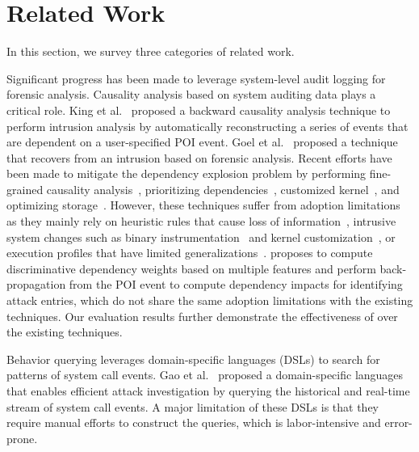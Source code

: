 
\section{Related Work}
\label{sec:literature}

In this section, we survey three categories of related work.


Significant progress has been made to leverage system-level audit logging for forensic analysis.
%
Causality analysis based on system auditing data plays a critical role.
King et al.~\cite{backtracking,backtracking2} proposed a backward causality analysis technique to perform intrusion analysis by automatically reconstructing a series of events that are dependent on a user-specified POI event.
Goel et al.~\cite{taser} proposed a technique that recovers from an intrusion based on forensic analysis.
Recent efforts have been made to mitigate the dependency explosion problem by performing fine-grained causality analysis~\cite{beep,ma2016protracer,mcitracking,ji2017rain,ji2018enabling}, prioritizing dependencies~\cite{liu2018priotracker,hassan2019nodoze}, customized kernel~\cite{trustkernel}, and optimizing storage~\cite{loggc,reduction,reduction2,reduction3}. 
However, these techniques suffer from adoption limitations as they mainly rely on heuristic rules that cause loss of information~\cite{backtracking}, intrusive system changes such as binary instrumentation~\cite{ma2016protracer,mcitracking} and kernel customization~\cite{trustkernel}, or execution profiles that have limited generalizations~\cite{hassan2019nodoze}.
\tool proposes to compute discriminative dependency weights based on multiple features and perform back-propagation from the POI event to compute dependency impacts for identifying attack entries, which do not share the same adoption limitations with the existing techniques. 
Our evaluation results further demonstrate the effectiveness of \tool over the existing techniques.


Behavior querying leverages domain-specific languages (DSLs) to search for patterns of system call events.
Gao et al.~\cite{gao2018aiql,gao2018saql} proposed a domain-specific languages that enables efficient attack investigation by querying the historical and real-time stream of system call events.
A major limitation of these DSLs is that they require manual efforts to construct the queries, which is labor-intensive and error-prone.


